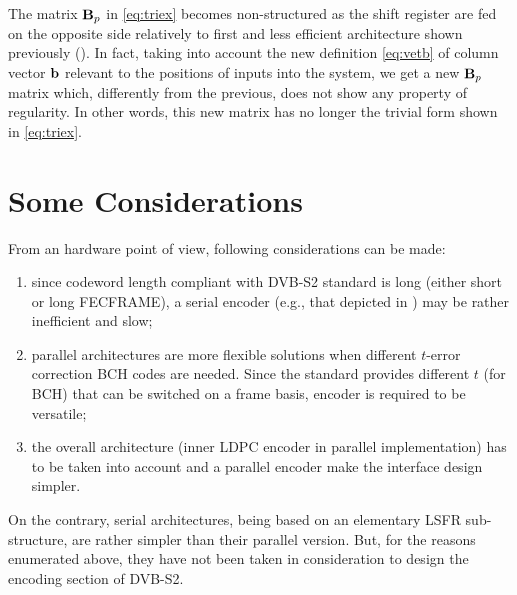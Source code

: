 The matrix $\mathbf{B}_p$ in \eqref{eq:triex} becomes non-structured as the shift register are fed on the opposite side relatively to first and less efficient architecture shown previously (). In fact, taking into account the new definition \eqref{eq:vetb} of column vector $\mathbf{b}$ relevant to the positions of inputs into the system, we get a new \(\mathbf{B}_p\) matrix which, differently from the previous, does not show any property of regularity. In other words, this new matrix has no longer the trivial form shown in \eqref{eq:triex}.

\section{Some Considerations}

From an hardware point of view, following considerations can be made:
\begin{enumerate}
\item since codeword length compliant with DVB-S2 standard is long (either short or long FECFRAME), a serial encoder (e.g., that depicted in ) may be rather inefficient and slow;
\item parallel architectures are more flexible solutions when different \(t\)-error correction BCH codes are needed.  Since the standard provides different \(t\) (for BCH) that can be switched on a frame basis, encoder is required to be versatile;
\item the overall architecture (inner LDPC encoder in parallel implementation) has to be taken into account and a parallel encoder make the interface design simpler.
\end{enumerate}
On the contrary, serial architectures, being based on an elementary LSFR sub-structure, are rather simpler than their parallel version. But, for the reasons enumerated above, they have not been taken in consideration to design the encoding section of DVB-S2.







